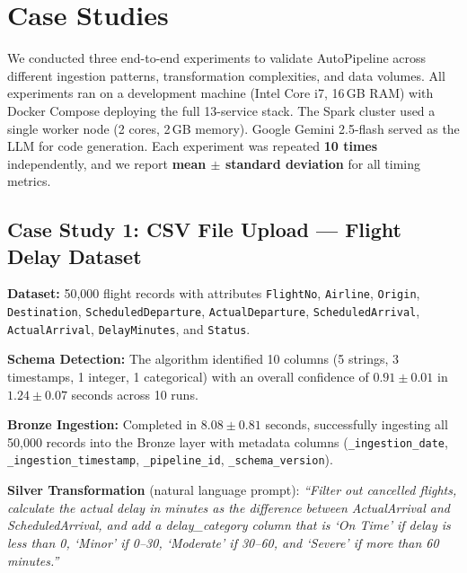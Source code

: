 
\section{Case Studies}

We conducted three end-to-end experiments to validate AutoPipeline across different ingestion patterns, transformation complexities, and data volumes. All experiments ran on a development machine (Intel Core i7, 16\,GB RAM) with Docker Compose deploying the full 13-service stack. The Spark cluster used a single worker node (2 cores, 2\,GB memory). Google Gemini 2.5-flash served as the LLM for code generation. Each experiment was repeated \textbf{10 times} independently, and we report \textbf{mean $\pm$ standard deviation} for all timing metrics.

\subsection{Case Study 1: CSV File Upload --- Flight Delay Dataset}

\textbf{Dataset:} 50,000 flight records with attributes \texttt{FlightNo}, \texttt{Airline}, \texttt{Origin}, \texttt{Destination}, \texttt{ScheduledDeparture}, \texttt{ActualDeparture}, \texttt{ScheduledArrival}, \texttt{ActualArrival}, \texttt{DelayMinutes}, and \texttt{Status}.

\textbf{Schema Detection:} The algorithm identified 10 columns (5 strings, 3 timestamps, 1 integer, 1 categorical) with an overall confidence of $0.91 \pm 0.01$ in $1.24 \pm 0.07$ seconds across 10 runs.

\textbf{Bronze Ingestion:} Completed in $8.08 \pm 0.81$ seconds, successfully ingesting all 50,000 records into the Bronze layer with metadata columns (\texttt{\_ingestion\_date}, \texttt{\_ingestion\_timestamp}, \texttt{\_pipeline\_id}, \texttt{\_schema\_version}).

\textbf{Silver Transformation} (natural language prompt): \textit{``Filter out cancelled flights, calculate the actual delay in minutes as the difference between ActualArrival and ScheduledArrival, and add a delay\_category column that is `On Time' if delay is less than 0, `Minor' if 0--30, `Moderate' if 30--60, and `Severe' if more than 60 minutes.''}

